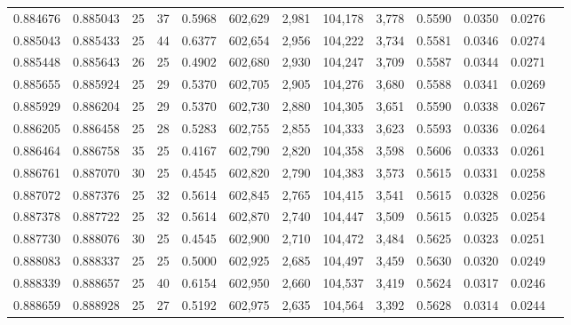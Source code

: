 \begin{tabular}{rrrrrrrrrrrrr}
0.884676 & 0.885043 &    25 &  37 &                                     0.5968 & 602,629 &   2,981 & 104,178 &   3,778 & 0.5590 & 0.0350 & 0.0276 \\
0.885043 & 0.885433 &    25 &  44 &                                     0.6377 & 602,654 &   2,956 & 104,222 &   3,734 & 0.5581 & 0.0346 & 0.0274 \\
0.885448 & 0.885643 &    26 &  25 &                                     0.4902 & 602,680 &   2,930 & 104,247 &   3,709 & 0.5587 & 0.0344 & 0.0271 \\
0.885655 & 0.885924 &    25 &  29 &                                     0.5370 & 602,705 &   2,905 & 104,276 &   3,680 & 0.5588 & 0.0341 & 0.0269 \\
0.885929 & 0.886204 &    25 &  29 &                                     0.5370 & 602,730 &   2,880 & 104,305 &   3,651 & 0.5590 & 0.0338 & 0.0267 \\
0.886205 & 0.886458 &    25 &  28 &                                     0.5283 & 602,755 &   2,855 & 104,333 &   3,623 & 0.5593 & 0.0336 & 0.0264 \\
0.886464 & 0.886758 &    35 &  25 &                                     0.4167 & 602,790 &   2,820 & 104,358 &   3,598 & 0.5606 & 0.0333 & 0.0261 \\
0.886761 & 0.887070 &    30 &  25 &                                     0.4545 & 602,820 &   2,790 & 104,383 &   3,573 & 0.5615 & 0.0331 & 0.0258 \\
0.887072 & 0.887376 &    25 &  32 &                                     0.5614 & 602,845 &   2,765 & 104,415 &   3,541 & 0.5615 & 0.0328 & 0.0256 \\
0.887378 & 0.887722 &    25 &  32 &                                     0.5614 & 602,870 &   2,740 & 104,447 &   3,509 & 0.5615 & 0.0325 & 0.0254 \\
0.887730 & 0.888076 &    30 &  25 &                                     0.4545 & 602,900 &   2,710 & 104,472 &   3,484 & 0.5625 & 0.0323 & 0.0251 \\
0.888083 & 0.888337 &    25 &  25 &                                     0.5000 & 602,925 &   2,685 & 104,497 &   3,459 & 0.5630 & 0.0320 & 0.0249 \\
0.888339 & 0.888657 &    25 &  40 &                                     0.6154 & 602,950 &   2,660 & 104,537 &   3,419 & 0.5624 & 0.0317 & 0.0246 \\
0.888659 & 0.888928 &    25 &  27 &                                     0.5192 & 602,975 &   2,635 & 104,564 &   3,392 & 0.5628 & 0.0314 & 0.0244 \\

\end{tabular}
